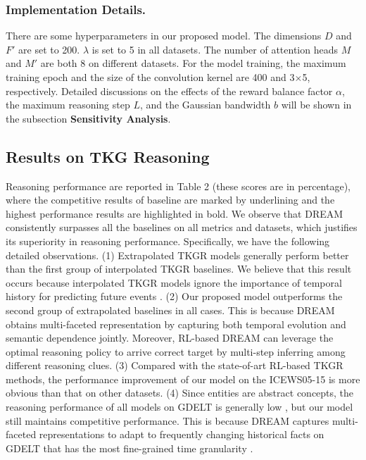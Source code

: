 \documentclass[sigconf,natbib=true]{acmart}
\begin{document}
\subsubsection{Implementation Details.}
There are some hyperparameters in our proposed model. The dimensions $D$ and $F'$ are set to 200. $\lambda$ is set to 5 in all datasets. The number of attention heads $M$ and $M'$ are both 8 on different datasets. For the model training, the maximum training epoch and the size of the convolution kernel are 400 and 3$\times$5, respectively. Detailed discussions on the effects of the  reward balance factor $\alpha$, the maximum reasoning step $L$, and the Gaussian bandwidth $b$ will be shown in the subsection \textbf{Sensitivity Analysis}.






\subsection{Results on TKG Reasoning}
Reasoning performance are reported in Table 2  (these scores are in percentage), where the competitive results of baseline are marked by underlining and the highest performance results are highlighted in bold. We observe that DREAM consistently surpasses all the baselines on all metrics and datasets, which justifies its  superiority in reasoning performance. Specifically, we have the following detailed observations. (1) Extrapolated TKGR models generally perform better than the first group of interpolated TKGR baselines. We believe that this result occurs because interpolated TKGR models ignore the importance of temporal history  for predicting future events \cite{TiTer}. 
(2) Our proposed model outperforms the second group of extrapolated baselines in all cases. This is because DREAM obtains multi-faceted representation by capturing both temporal evolution and semantic dependence jointly. Moreover, RL-based DREAM can leverage the optimal reasoning policy to arrive correct target by multi-step inferring  among different reasoning clues. (3) Compared with the state-of-art RL-based TKGR methods, the performance improvement of our model on the ICEWS05-15 is more obvious than that on other datasets. %
(4) Since entities are abstract concepts, the reasoning performance of all models on GDELT is generally low \cite{Cluster}, but our model still maintains competitive performance. This is because DREAM captures multi-faceted representations to adapt to frequently changing historical facts on GDELT that has the most fine-grained time granularity \cite{HiSMatch}. 
\end{document}
